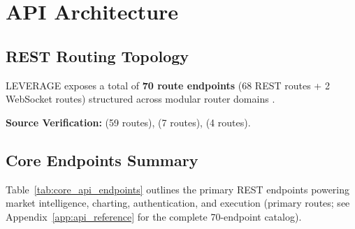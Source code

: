 \chapter{API Architecture}
\label{ch:api_architecture}

\section{REST Routing Topology}
LEVERAGE exposes a total of \textbf{70 route endpoints} (68 REST routes + 2 WebSocket routes) structured across modular router domains \cite{ref:main_py}.

\begin{citationbox}
\textbf{Source Verification:}  (59 routes),  (7 routes),  (4 routes).
\end{citationbox}

\section{Core Endpoints Summary}
Table~\ref{tab:core_api_endpoints} outlines the primary REST endpoints powering market intelligence, charting, authentication, and execution (primary routes; see Appendix~\ref{app:api_reference} for the complete 70-endpoint catalog).

